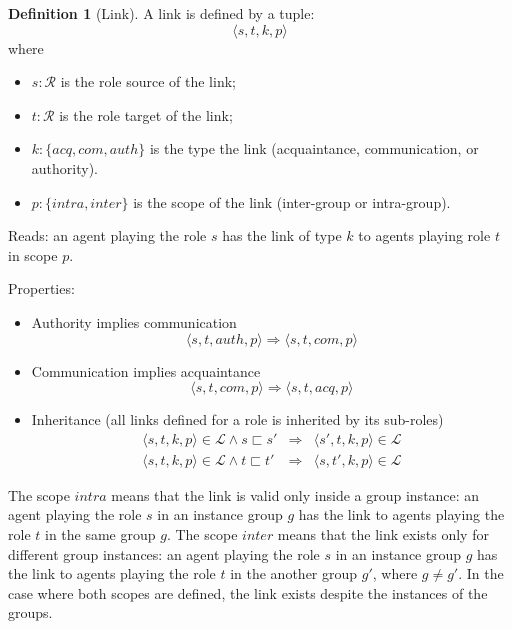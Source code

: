 \documentclass{article}
\newcommand{\set}[1]{\mathcal{#1}}
\newcommand{\subrole}{\sqsubset}
\theoremstyle{definition} \newtheorem{definition}{Definition}
\begin{document}
\begin{definition}[Link]
  A link is defined by a tuple:
  \begin{displaymath}
    \langle s, t, k, p \rangle    
  \end{displaymath}
  where
  \begin{itemize}
  \item $s : \set{R}$ is the role source of the link;
  \item $t : \set{R}$ is the role target of the link;
  \item $k : \{ acq, com, auth\}$ is the type the link
    (acquaintance, communication, or authority).
  \item $p : \{ intra, inter \}$ is the scope of the link
    (inter-group or intra-group).
  \end{itemize}

  Reads: an agent playing the role $s$ has the link of type $k$ to
  agents playing role $t$ in scope $p$.

  Properties:
  \begin{itemize}
  \item Authority implies communication
    \begin{equation}
       \langle s, t, auth, p \rangle \Rightarrow  \langle s, t, com, p \rangle
    \end{equation}

  \item Communication implies acquaintance
    \begin{equation}
       \langle s, t, com, p \rangle \Rightarrow  \langle s, t, acq, p \rangle
    \end{equation}

  \item Inheritance (all links defined for a role is inherited by its sub-roles)
    \begin{eqnarray}
    \langle s, t, k, p \rangle \in \set{L} \land s \subrole s' &\Rightarrow&  \langle s', t, k, p \rangle \in \set{L}\\
    \langle s, t, k, p \rangle \in \set{L} \land t \subrole t' &\Rightarrow&  \langle s, t', k, p \rangle  \in \set{L}
    \end{eqnarray}

  \end{itemize}
\end{definition}

The scope $intra$ means that the link is valid only inside a group
instance: an agent playing the role $s$ in an instance group $g$ has
the link to agents playing the role $t$ in the same group $g$. The
scope $inter$ means that the link exists only for different group
instances: an agent playing the role $s$ in an instance group $g$ has
the link to agents playing the role $t$ in the another group $g'$,
where $g \neq g'$. In the case where both scopes are defined, the link
exists despite the instances of the groups.
\end{document}
